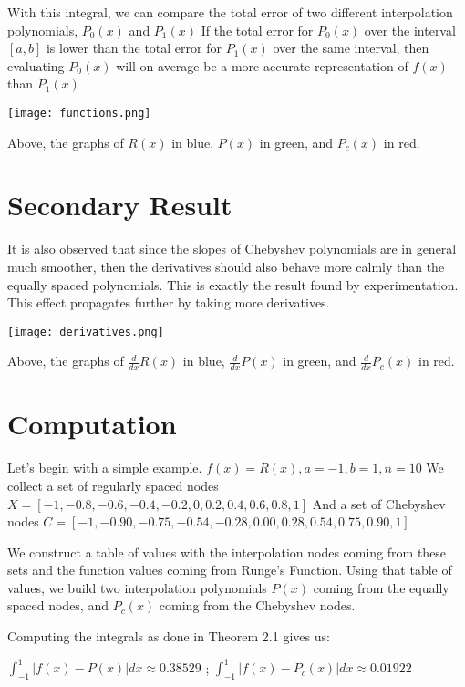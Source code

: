\documentclass[]{article}
\theoremstyle{plain}
\theoremstyle{definition}
\begin{document}
 With this integral, we can compare the total error of two different interpolation polynomials, $P_0(x)$ and $P_1(x)$ If the total error for $P_0(x)$ over the interval $[a,b]$ is lower than the total error for $P_1(x)$ over the same interval, then evaluating $P_0(x)$ will on average be a more accurate representation of $f(x)$ than $P_1(x)$
 
 \texttt{[image: functions.png]} 
 
 Above, the graphs of $R(x)$ in blue, $P(x)$ in green, and $P_c(x)$ in red. 
  
 \section{Secondary Result}

It is also observed that since the slopes of Chebyshev polynomials are in general much smoother, then the derivatives should also behave more calmly than the equally spaced polynomials. This is exactly the result found by experimentation. This effect propagates further by taking more derivatives. 

\texttt{[image: derivatives.png]} 

 Above, the graphs of $\frac{d}{dx}R(x)$ in blue, $\frac{d}{dx}P(x)$ in green, and $\frac{d}{dx}P_c(x)$ in red. 


\section{Computation}
Let's begin with a simple example. $f(x) = R(x), a = -1, b = 1, n = 10$
\newline 
We collect a set of regularly spaced nodes $X = [-1,-0.8,-0.6,-0.4,-0.2,0,0.2,0.4,0.6,0.8,1]$
\newline 
And a set of Chebyshev nodes $C = [-1,-0.90,-0.75,-0.54,-0.28,0.00,0.28,0.54,0.75,0.90,1]$

We construct a table of values with the interpolation nodes coming from these sets and the function values coming from Runge's Function. Using that table of values, we build two interpolation polynomials $P(x)$ coming from the equally spaced nodes, and $P_c(x)$ coming from the Chebyshev nodes.
\newline 

Computing the integrals as done in Theorem 2.1 gives us: 

$\int_{-1}^{1} |f(x) - P(x)|dx \approx 0.38529$ ; $\int_{-1}^{1} |f(x) - P_c(x)|dx \approx 0.01922$
\end{document}
